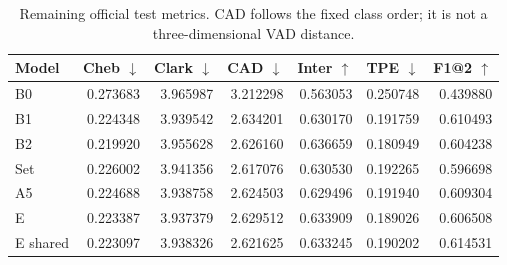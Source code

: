 \begin{table}[!htbp]
\centering
\footnotesize
\setlength{\tabcolsep}{5pt}
\begin{tabular}{lrrrrrr}
\toprule
Model & Cheb $\downarrow$ & Clark $\downarrow$ & CAD $\downarrow$ & Inter $\uparrow$ & TPE $\downarrow$ & F1@2 $\uparrow$ \\
\midrule
B0 & 0.273683 & 3.965987 & 3.212298 & 0.563053 & 0.250748 & 0.439880 \\
B1 & 0.224348 & 3.939542 & 2.634201 & 0.630170 & 0.191759 & 0.610493 \\
B2 & 0.219920 & 3.955628 & 2.626160 & 0.636659 & 0.180949 & 0.604238 \\
Set & 0.226002 & 3.941356 & 2.617076 & 0.630530 & 0.192265 & 0.596698 \\
A5 & 0.224688 & 3.938758 & 2.624503 & 0.629496 & 0.191940 & 0.609304 \\
E & 0.223387 & 3.937379 & 2.629512 & 0.633909 & 0.189026 & 0.606508 \\
E shared & 0.223097 & 3.938326 & 2.621625 & 0.633245 & 0.190202 & 0.614531 \\
\bottomrule
\end{tabular}
\caption{Remaining official test metrics. CAD follows the fixed class order; it is not a three-dimensional VAD distance.}
\label{tab:secondary}
\end{table}

